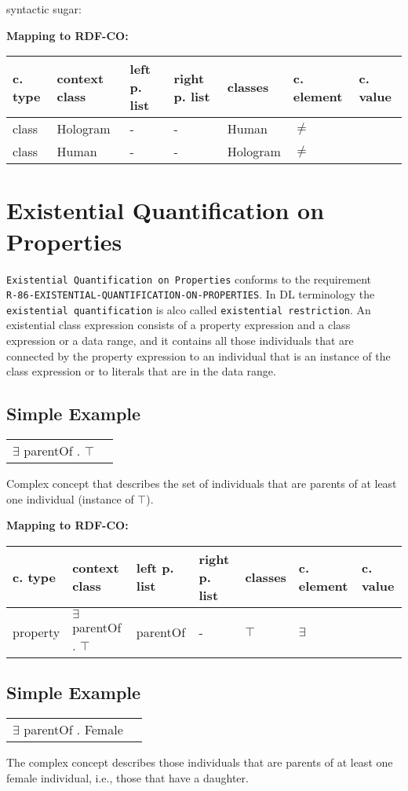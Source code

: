 \documentclass{llncs}
\newcommand{\ms}[1]{\texttt{#1}}
\newenvironment{gcotable}{
  \scriptsize
  \sffamily
  \vspace{0cm}
	\begin{center}
	\textbf{\vspace{0.4cm}Mapping to RDF-CO:} \\
  \begin{tabular}{l|l|l|l|l|l|l}
	\hline
  \textbf{c. type} & \textbf{context class} & \textbf{left p. list} & \textbf{right p. list} & \textbf{classes} & \textbf{c. element} & \textbf{c. value} \\
  \hline

}{
  \hline
  \end{tabular}
	\end{center}
}
\newenvironment{DL}{
  \vspace{0cm}
	\begin{center}
  \begin{tabular}{r l}

}{
  \end{tabular}
	\end{center}
}
\begin{document}
syntactic sugar:

\begin{gcotable}
class & Hologram & - & - & Human & $\ne$ \\
class & Human & - & - & Hologram & $\ne$ \\
\end{gcotable}

\section{Existential Quantification on Properties}

\ms{Existential Quantification on Properties} conforms to the requirement \\
\ms{R-86-EXISTENTIAL-QUANTIFICATION-ON-PROPERTIES}.
In DL terminology the \ms{existential quantification} is alco called \ms{existential restriction}.
An existential class expression consists of a property expression and a class expression or a data range, and it contains all those individuals that are connected by the property expression to an individual that is an instance of the class expression or to literals that are in the data range.  

\subsection{Simple Example}

\begin{DL}
$\exists$ parentOf . $\top$
\end{DL}

Complex concept that describes the set
of individuals that are parents of at least one individual (instance of $\top$). 

\begin{gcotable}
property & $\exists$ parentOf . $\top$ & parentOf & - & $\top$ & $\exists$ \\
\end{gcotable}

\subsection{Simple Example}

\begin{DL}
$\exists$ parentOf . Female
\end{DL}

The complex concept describes those individuals that are parents of at least one
female individual, i.e., those that have a daughter.
\end{document}
